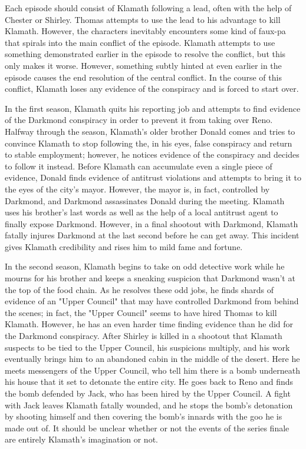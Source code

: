 \documentclass{article}
\begin{document}
Each episode should consist of Klamath following a lead, often with the help of Chester or Shirley. Thomas attempts to use the lead to his advantage to kill Klamath. However, the characters inevitably encounters some kind of faux-pa that spirals into the main conflict of the episode. Klamath attempts to use something demonstrated earlier in the episode to resolve the conflict, but this only makes it worse. However, something subtly hinted at even earlier in the episode causes the end resolution of the central conflict. In the course of this conflict, Klamath loses any evidence of the conspiracy and is forced to start over.

In the first season, Klamath quits his reporting job and attempts to find evidence of the Darkmond conspiracy in order to prevent it from taking over Reno. Halfway through the season, Klamath's older brother Donald comes and tries to convince Klamath to stop following the, in his eyes, false conspiracy and return to stable employment; however, he notices evidence of the conspiracy and decides to follow it instead. Before Klamath can accumulate even a single piece of evidence, Donald finds evidence of antitrust violations and attempts to bring it to the eyes of the city's mayor. However, the mayor is, in fact, controlled by Darkmond, and Darkmond assassinates Donald during the meeting. Klamath uses his brother's last words as well as the help of a local antitrust agent to finally expose Darkmond. However, in a final shootout with Darkmond, Klamath fatally injures Darkmond at the last second before he can get away. This incident gives Klamath credibility and rises him to mild fame and fortune.

In the second season, Klamath begins to take on odd detective work while he mourns for his brother and keeps a sneaking suspicion that Darkmond wasn't at the top of the food chain. As he resolves these odd jobs, he finds shards of evidence of an "Upper Council" that may have controlled Darkmond from behind the scenes; in fact, the "Upper Council" seems to have hired Thomas to kill Klamath. However, he has an even harder time finding evidence than he did for the Darkmond conspiracy. After Shirley is killed in a shootout that Klamath suspects to be tied to the Upper Council, his suspicions multiply, and his work eventually brings him to an abandoned cabin in the middle of the desert. Here he meets messengers of the Upper Council, who tell him there is a bomb underneath his house that it set to detonate the entire city. He goes back to Reno and finds the bomb defended by Jack, who has been hired by the Upper Council. A fight with Jack leaves Klamath fatally wounded, and he stops the bomb's detonation by shooting himself and then covering the bomb's innards with the goo he is made out of. It should be unclear whether or not the events of the series finale are entirely Klamath's imagination or not.
\end{document}
